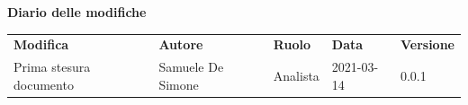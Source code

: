 \documentclass[a4paper]{article}
\begin{document}
\begin{center}
    \textbf{\Large Diario delle modifiche}\\
    \vspace{10px}
    \begin{table}[h!]
        \centering
        \renewcommand{\arraystretch}{1.8}
        \begin{tabular}{p{150px} p{90px} p{50px} p{60px} p{45px}}
            \rowcolor{logo!70} \textbf{Modifica} & \textbf{Autore}   & \textbf{Ruolo} & \textbf{Data} & \textbf{Versione} \\
            Prima stesura documento              & Samuele De Simone & Analista       & 2021-03-14    & 0.0.1             \\
        \end{tabular}
    \end{table}
\end{center}

\newpage
\tableofcontents
\newpage
\appendix


























\end{document}
